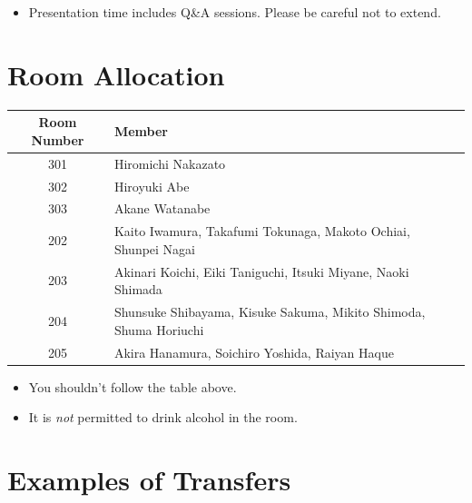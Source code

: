 \documentclass[unicode,a4paper,11pt]{ltjsarticle}
\begin{document}
\begin{itemize}
  \item
        Presentation time includes Q\&A sessions. Please be careful not to extend.
\end{itemize}

\section{Room Allocation}

\begin{center}
  \begin{tabular}{cl}\hline
    Room Number & Member                                                            \\ \hline
    301         & Hiromichi Nakazato                                                \\
    302         & Hiroyuki Abe                                                      \\
    303         & Akane Watanabe                                                    \\
    202         & Kaito Iwamura, Takafumi Tokunaga, Makoto Ochiai, Shunpei Nagai    \\
    203         & Akinari Koichi, Eiki Taniguchi, Itsuki Miyane, Naoki Shimada      \\
    204         & Shunsuke Shibayama, Kisuke Sakuma, Mikito Shimoda, Shuma Horiuchi \\
    205         & Akira Hanamura, Soichiro Yoshida, Raiyan Haque                    \\ \hline
  \end{tabular}
\end{center}

\begin{itemize}
  \item
        You shouldn't follow the table above.
  \item
        It is \textit{not} permitted to drink alcohol in the room.
\end{itemize}


\section{Examples of Transfers}

\vspace*{5pt}
\end{document}
